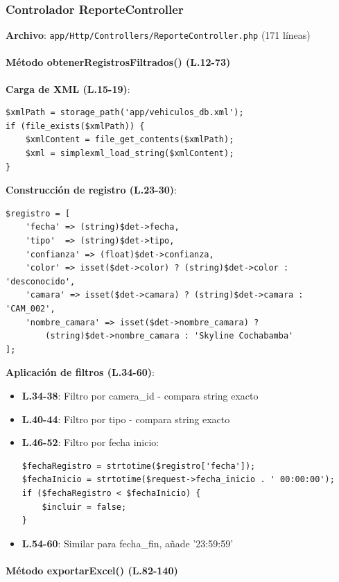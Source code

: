 \subsubsection{Controlador ReporteController}

\textbf{Archivo}: \texttt{app/Http/Controllers/ReporteController.php} (171 líneas)

\paragraph{Método obtenerRegistrosFiltrados() (L.12-73)}

\textbf{Carga de XML (L.15-19)}:
\begin{lstlisting}[style=phpstyle]
$xmlPath = storage_path('app/vehiculos_db.xml');
if (file_exists($xmlPath)) {
    $xmlContent = file_get_contents($xmlPath);
    $xml = simplexml_load_string($xmlContent);
}
\end{lstlisting}

\textbf{Construcción de registro (L.23-30)}:
\begin{lstlisting}[style=phpstyle]
$registro = [
    'fecha' => (string)$det->fecha,
    'tipo'  => (string)$det->tipo,
    'confianza' => (float)$det->confianza,
    'color' => isset($det->color) ? (string)$det->color : 'desconocido',
    'camara' => isset($det->camara) ? (string)$det->camara : 'CAM_002',
    'nombre_camara' => isset($det->nombre_camara) ? 
        (string)$det->nombre_camara : 'Skyline Cochabamba'
];
\end{lstlisting}

\textbf{Aplicación de filtros (L.34-60)}:
\begin{itemize}
    \item \textbf{L.34-38}: Filtro por camera\_id - compara string exacto
    \item \textbf{L.40-44}: Filtro por tipo - compara string exacto
    \item \textbf{L.46-52}: Filtro por fecha inicio:
    \begin{lstlisting}[style=phpstyle]
$fechaRegistro = strtotime($registro['fecha']);
$fechaInicio = strtotime($request->fecha_inicio . ' 00:00:00');
if ($fechaRegistro < $fechaInicio) {
    $incluir = false;
}
    \end{lstlisting}
    \item \textbf{L.54-60}: Similar para fecha\_fin, añade '23:59:59'
\end{itemize}

\paragraph{Método exportarExcel() (L.82-140)}

